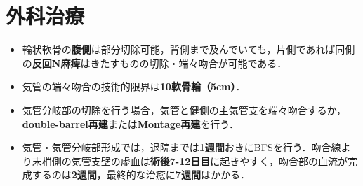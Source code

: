 \newpage


\section{外科治療}

\begin{itemize}

\item 輪状軟骨の\textbf{腹側}は部分切除可能，背側まで及んでいても，片側であれば同側の\textbf{反回N麻痺}はきたすものの切除・端々吻合が可能である．
\item 気管の端々吻合の技術的限界は\textbf{10軟骨輪（5cm）}．
\item 気管分岐部の切除を行う場合，気管と健側の主気管支を端々吻合するか，\textbf{double-barrel再建}または\textbf{Montage再建}を行う．
\item 気管・気管分岐部形成では，退院までは\textbf{1週間}おきにBFSを行う．吻合線より末梢側の気管支壁の虚血は\textbf{術後7-12日目}に起きやすく，吻合部の血流が完成するのは\textbf{2週間}，最終的な治癒に\textbf{7週間}はかかる．

\end{itemize}



